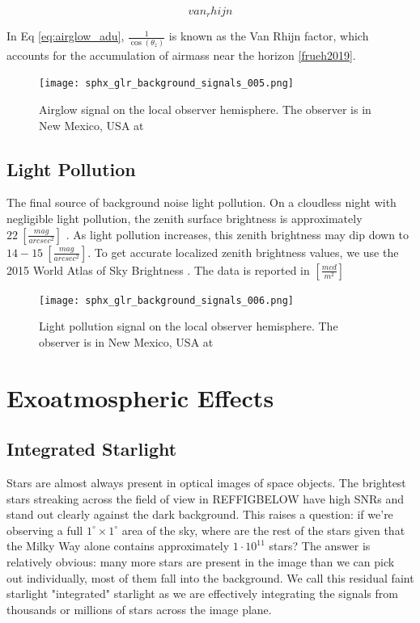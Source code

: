 \begin{equation} \label{eq:airglow_adu}
van_rhijn
\end{equation}

In Eq \ref{eq:airglow_adu}, $\frac{1}{\cos(\theta_z)}$ is known as the Van Rhijn factor, which
accounts for the accumulation of airmass near the horizon \ref{frueh2019}.

\begin{figure}[ht]
  \centering
  \texttt{[image: sphx\_glr\_background\_signals\_005.png]}
  \caption{Airglow signal on the local observer hemisphere. The observer is in New Mexico, USA at
  \pogslla}
  \label{fig:airglowhemi}
\end{figure}

\subsection{Light Pollution}

The final source of background noise light pollution. On a cloudless night with negligible light
pollution, the zenith surface brightness is approximately $22 \: \left[ \frac{mag}{arcsec^2}
\right]$ \cite{krag2003}. As light pollution increases, this zenith brightness may dip down to
$14-15 \: \left[ \frac{mag}{arcsec^2} \right]$. To get accurate localized zenith brightness values,
we use the 2015 World Atlas of Sky Brightness \cite{falchi2016_data}. The data is reported in $\left[
	\frac{mcd}{m^2} \right]$

\begin{figure}[ht]
  \centering
  \texttt{[image: sphx\_glr\_background\_signals\_006.png]}
  \caption{Light pollution signal on the local observer hemisphere. The observer is in New Mexico, USA at
  \pogslla}
  \label{fig:pollutionhemi}
\end{figure}

\section{Exoatmospheric Effects}

\subsection{Integrated Starlight}

Stars are almost always present in optical images of space objects. The brightest stars streaking across the field of view in REFFIGBELOW have high SNRs and stand out clearly against the dark background. This raises a question: if we're observing a full $1^\circ \times 1^\circ$ area of the sky, where are the rest of the stars given that the Milky Way alone contains approximately $1\cdot10^{11}$ stars? The answer is relatively obvious: many more stars are present in the image than we can pick out individually, most of them fall into the background. We call this residual faint starlight "integrated" starlight as we are effectively integrating the signals from thousands or millions of stars across the image plane. 

